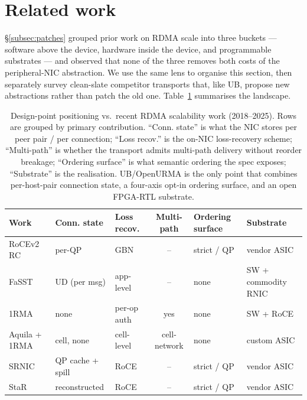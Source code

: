 \documentclass[10pt,twocolumn]{article}
\begin{document}
\section{Related work}
\label{sec:related}

\S\ref{subsec:patches} grouped prior work on RDMA scale into three
buckets --- software above the device, hardware inside the device,
and programmable substrates --- and observed that none of the three
removes both costs of the peripheral-NIC abstraction. We use the
same lens to organise this section, then separately survey clean-slate
competitor transports that, like UB, propose new abstractions rather
than patch the old one. Table~\ref{tab:positioning} summarises the
landscape.

\begin{table}[t]
\centering\scriptsize
\setlength{\tabcolsep}{3pt}
\caption{Design-point positioning vs.\ recent RDMA scalability work
(2018--2025). Rows are grouped by primary contribution. ``Conn.
state'' is what the NIC stores per peer pair / per connection;
``Loss recov.'' is the on-NIC loss-recovery scheme; ``Multi-path''
is whether the transport admits multi-path delivery without
reorder breakage; ``Ordering surface'' is what semantic ordering
the spec exposes; ``Substrate'' is the realisation. UB/OpenURMA
is the only point that combines per-host-pair connection state, a
four-axis opt-in ordering surface, and an open FPGA-RTL substrate.}
\label{tab:positioning}
\begin{tabular}{l l l c l l}
\toprule
Work & Conn. state & Loss recov. & Multi-path & Ordering surface & Substrate \\
\midrule
RoCEv2 RC                                & per-QP            & GBN              & --           & strict / QP     & vendor ASIC \\
FaSST~\cite{kalia:fasst-extended}             & UD (per msg)      & app-level        & --           & none            & SW + commodity RNIC \\
1RMA~\cite{singhvi2020:1rma}             & none              & per-op auth      & yes          & none            & SW + RoCE \\
Aquila + 1RMA~\cite{gibson2022:aquila}   & cell, none        & cell-level       & cell-network & none            & custom ASIC \\
SRNIC~\cite{wang2023:srnic}              & QP cache + spill  & RoCE             & --           & strict / QP     & vendor ASIC \\
StaR~\cite{wang2021:star}                 & reconstructed     & RoCE             & --           & strict / QP     & vendor ASIC \\

\end{tabular}
\end{table}
\end{document}
